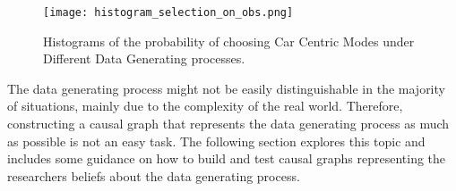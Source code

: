 \begin{figure}
   \centering
   \texttt{[image: histogram\_selection\_on\_obs.png]}
   \caption{Histograms of the probability of choosing Car Centric Modes under Different Data Generating processes.}
   \label{fig:histogram_probability}
\end{figure}

The data generating process might not be easily distinguishable in the majority of situations, mainly due to the complexity of the real world.
Therefore, constructing a causal graph that represents the data generating process as much as possible is not an easy task.
The following section explores this topic and includes some guidance on how to build and test causal graphs representing the researchers beliefs about the data generating process.
